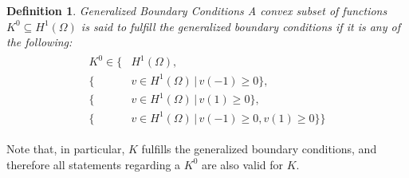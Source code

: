 \documentclass[headsepline,footsepline,footinclude=false,oneside,fontsize=11pt,paper=a4,listof=totoc,bibliography=totoc]{scrbook} %
\newtheorem{definition}{Definition}
\begin{document}
\begin{definition} Generalized Boundary Conditions \newline
	A convex subset of functions $K^0 \subseteq H^1(\Omega)$ is said to fulfill the generalized boundary conditions if it is any of the following:
	\begin{align}
	\begin{split} \label{eq:generalized_boundary_condition_set}
	K^0 \in \big\{ &H^1(\Omega), \\
	\{ &v\in H^1(\Omega) \,|\, v(-1) \geq 0\}, \\
	\{ &v\in H^1(\Omega) \,|\, v(1) \geq 0 \}, \\
	\{ &v\in H^1(\Omega) \,|\, v(-1) \geq 0, v(1) \geq 0\}
	\big\}
	\end{split}
	\end{align}
\end{definition}

Note that, in particular, $K$ fulfills the generalized boundary conditions, and therefore all statements regarding a $K^0$ are also valid for $K$.
\end{document}
